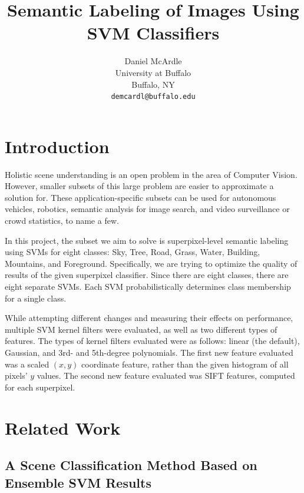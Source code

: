 \documentclass[10pt,twocolumn,letterpaper]{article}
\begin{document}
\title{Semantic Labeling of Images Using SVM Classifiers}

\author{Daniel McArdle\\
University at Buffalo\\
Buffalo, NY\\
{\tt\small demcardl@buffalo.edu}
}

\maketitle

\section{Introduction}

Holistic scene understanding is an open problem in the area of Computer Vision.  However, smaller subsets of this large problem are easier to approximate a solution for.  These application-specific subsets can be used for autonomous vehicles, robotics, semantic analysis for image search, and video surveillance or crowd statistics, to name a few.

In this project, the subset we aim to solve is superpixel-level semantic labeling using SVMs for eight classes: Sky, Tree, Road, Grass, Water, Building, Mountains, and Foreground.  Specifically, we are trying to optimize the quality of results of the given superpixel classifier. Since there are eight classes, there are eight separate SVMs. Each SVM probabilistically determines class membership for a single class.

While attempting different changes and measuring their effects on performance, multiple SVM kernel filters were evaluated, as well as two different types of features.  The types of kernel filters evaluated were as follows: linear (the default), Gaussian, and 3rd- and 5th-degree polynomials. The first new feature evaluated was a scaled $(x,y)$ coordinate feature, rather than the given histogram of all pixels' $y$ values. The second new feature evaluated was SIFT features, computed for each superpixel.

\section{Related Work}




\subsection{A Scene Classification Method Based on Ensemble SVM Results \cite{luo}}
\label{sec:luo_section}
\end{document}
